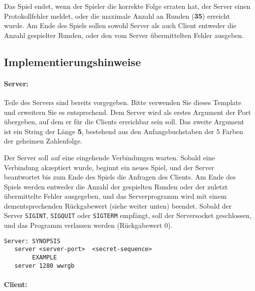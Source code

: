 Das Spiel endet, wenn der Spieler die korrekte Folge erraten hat, der Server
einen Protokollfehler meldet, oder die maximale Anzahl an Runden (\textbf{35})
erreicht wurde. Am Ende des Spiels sollen sowohl Server als auch Client
entweder die Anzahl gespielter Runden, oder den vom Server übermittelten
Fehler ausgeben.

\subsection*{Implementierungshinweise}
\label{sec:implhints}
\paragraph{Server:}
Teile des Servers sind bereits vorgegeben. Bitte verwenden Sie dieses Template und erweitern Sie es entsprechend.
Dem Server wird als erstes Argument der Port übergeben, auf dem er für die Clients
erreichbar sein soll. Das zweite Argument ist ein String der Länge \textbf{5},
bestehend aus den Anfangsbuchstaben der 5 Farben der geheimen Zahlenfolge.


Der Server soll auf eine eingehende Verbindungen warten. Sobald eine
Verbindung akzeptiert wurde, beginnt ein neues Spiel, und der Server
beantwortet bis zum Ende des Spiels die Anfragen des Clients. Am Ende des
Spiels werden entweder die Anzahl der gespielten Runden oder der zuletzt
übermittelte Fehler ausgegeben, und das Serverprogramm wird mit einem
dementsprechenden Rückgabewert (siehe weiter unten) beendet. Sobald der Server
\texttt{SIGINT}, \texttt{SIGQUIT} oder \texttt{SIGTERM} empfängt, soll der
Serversocket geschlossen, und das Programm verlassen werden (Rückgabewert 0).

\begin{verbatim}
Server: SYNOPSIS
   server <server-port>  <secret-sequence>
        EXAMPLE
   server 1280 wwrgb
\end{verbatim}

\paragraph{Client:}

